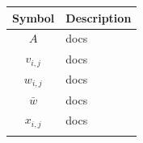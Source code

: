 \documentclass{article}
\begin{document}
\begin{table}
\begin{tabular}{c|p{4in}}
Symbol & Description \\
\hline \hline
$A$ & docs\\$v_{i,j}$ & docs\\$w_{i,j}$ & docs\\$\bar w$ & docs\\$x_{i,j}$ & docs\\ \\ \hline
\end{tabular}
\end{table}
\end{document}
